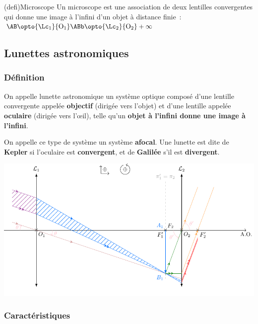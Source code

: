 \documentclass[../../main/main.tex]{subfiles}
\begin{document}
\begin{tcb}[label=defi:microscope, cnt, bld](defi){Microscope}
	Un microscope est une association de deux lentilles convergentes qui donne
	une image à l'infini d'un objet à distance finie~: $\AB \opto{\Lc_1}{\rm O_1}
		\ABb \opto{\Lc_2}{\rm O_2} +\infty$
\end{tcb}

\subsection{Lunettes astronomiques}
\subsubsection{Définition}

On appelle lunette astronomique un système optique composé d'une lentille
convergente appelée \textbf{objectif} (dirigée vers l'objet) et d'une
lentille appelée \textbf{oculaire} (dirigée vers l'œil), telle qu'un
\textbf{objet à l'infini donne une image à l'infini}.

On appelle ce type de système un système \textbf{afocal}. Une lunette est dite
de \textbf{Kepler} si l'oculaire est \textbf{convergent}, et de
\textbf{Galilée} s'il est \textbf{divergent}.

\begin{center}
	\includegraphics[width=\linewidth]{kepler}
	\label{fig:kepler}
\end{center}

\subsubsection{Caractéristiques}
\end{document}
